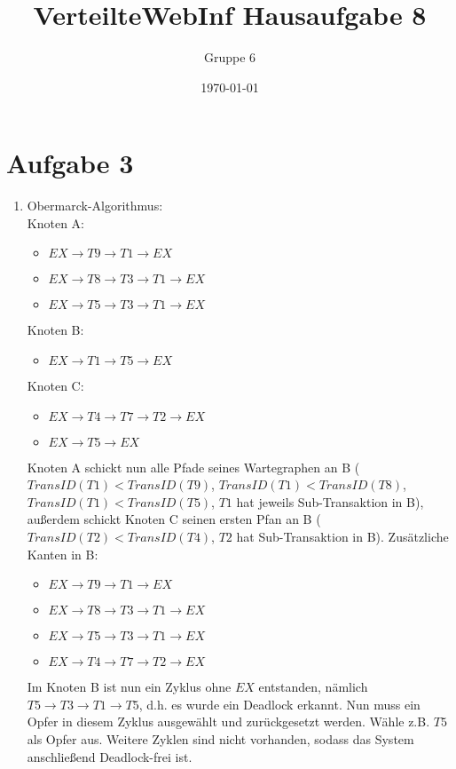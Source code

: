 \documentclass[a4paper]{article}
\author{Gruppe 6}
\title{\textbf{VerteilteWebInf Hausaufgabe 8}}
\date{\today}
\begin{document}
\maketitle


\section*{Aufgabe 3}
\begin{enumerate}[label=\alph*)]
\item Obermarck-Algorithmus:\\
Knoten A: 
\begin{itemize}
\item $EX\rightarrow T9\rightarrow T1 \rightarrow EX$
\item $EX\rightarrow T8\rightarrow T3 \rightarrow T1 \rightarrow EX$
\item $EX\rightarrow T5\rightarrow T3 \rightarrow T1 \rightarrow EX$
\end{itemize}
Knoten B: 
\begin{itemize}
\item $EX\rightarrow T1\rightarrow T5 \rightarrow EX$
\end{itemize}
Knoten C: 
\begin{itemize}
\item $EX\rightarrow T4\rightarrow T7 \rightarrow T2 \rightarrow EX$
\item $EX\rightarrow  T5 \rightarrow EX$
\end{itemize}
Knoten A schickt nun alle Pfade seines Wartegraphen an B ($TransID(T1)<TransID(T9)$, $TransID(T1)<TransID(T8)$,  $TransID(T1)<TransID(T5)$, $T1$ hat jeweils Sub-Transaktion in B), außerdem schickt Knoten C seinen ersten Pfan an B ($TransID(T2)<TransID(T4)$, $T2$ hat Sub-Transaktion in B). Zusätzliche Kanten in B:
\begin{itemize}
\item $EX\rightarrow T9\rightarrow T1 \rightarrow EX$
\item $EX\rightarrow T8\rightarrow T3 \rightarrow T1 \rightarrow EX$
\item $EX\rightarrow T5\rightarrow T3 \rightarrow T1 \rightarrow EX$
\item $EX\rightarrow T4\rightarrow T7 \rightarrow T2 \rightarrow EX$
\end{itemize}
Im Knoten B ist nun ein Zyklus ohne $EX$ entstanden, nämlich $T5\rightarrow T3\rightarrow T1 \rightarrow T5$, d.h. es wurde ein Deadlock erkannt. Nun muss ein Opfer in diesem Zyklus ausgewählt und zurückgesetzt werden. Wähle z.B. $T5$ als Opfer aus. Weitere Zyklen sind nicht vorhanden, sodass das System anschließend Deadlock-frei ist.


\end{enumerate}
\end{document}

